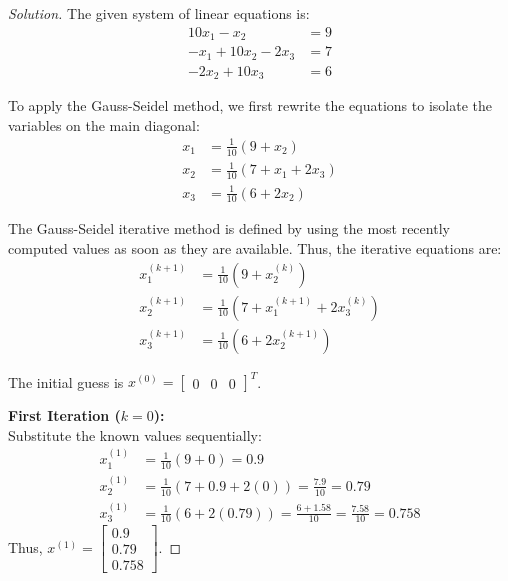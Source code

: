 \documentclass[11pt, a4paper]{article}
\newif\ifsolutionnewpage
\newenvironment{solution}
  {\begin{proof}[Solution]}
  {\end{proof}\ifsolutionnewpage\newpage\fi}
\begin{document}
\begin{solution}
    The given system of linear equations is:
    \begin{align*}
        10x_{1} - x_{2} &= 9 \\
        -x_{1} + 10x_{2} - 2x_{3} &= 7 \\
        -2x_{2} + 10x_{3} &= 6
    \end{align*}

    To apply the Gauss-Seidel method, we first rewrite the equations to isolate the variables on the main diagonal:
    \begin{align*}
        x_{1} &= \frac{1}{10} \left( 9 + x_{2} \right) \\
        x_{2} &= \frac{1}{10} \left( 7 + x_{1} + 2x_{3} \right) \\
        x_{3} &= \frac{1}{10} \left( 6 + 2x_{2} \right)
    \end{align*}

    The Gauss-Seidel iterative method is defined by using the most recently computed values as soon as they are available. Thus, the iterative equations are:
    \begin{align*}
        x_{1}^{(k+1)} &= \frac{1}{10} \left( 9 + x_{2}^{(k)} \right) \\
        x_{2}^{(k+1)} &= \frac{1}{10} \left( 7 + x_{1}^{(k+1)} + 2x_{3}^{(k)} \right) \\
        x_{3}^{(k+1)} &= \frac{1}{10} \left( 6 + 2x_{2}^{(k+1)} \right)
    \end{align*}

    The initial guess is $x^{(0)} = \begin{bmatrix} 0 & 0 & 0 \end{bmatrix}^T$.

    \textbf{First Iteration ($k=0$):} \\
    Substitute the known values sequentially:
    \begin{align*}
        x_{1}^{(1)} &= \frac{1}{10} \left( 9 + 0 \right) = 0.9 \\[1ex]
        x_{2}^{(1)} &= \frac{1}{10} \left( 7 + 0.9 + 2(0) \right) = \frac{7.9}{10} = 0.79 \\[1ex]
        x_{3}^{(1)} &= \frac{1}{10} \left( 6 + 2(0.79) \right) = \frac{6 + 1.58}{10} = \frac{7.58}{10} = 0.758
    \end{align*}
    Thus, $x^{(1)} = \begin{bmatrix} 0.9 \\ 0.79 \\ 0.758 \end{bmatrix}$.


\end{solution}
\end{document}
